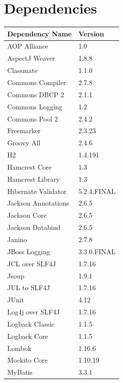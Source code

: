 \documentclass[12pt]{scrreprt}
\begin{document}
		\section{Dependencies}
			\label{sec:appendix_dependencies}

			\begin{longtable}{ l | l }
				\label{tab:appendix_dependencies}

				\textbf{Dependency Name} & \textbf{Version} \\
				\hline
				AOP Alliance						& 1.0				\\
				AspectJ Weaver						& 1.8.8				\\
				Classmate							& 1.1.0				\\
				Commons Compiler					& 2.7.8				\\
				Commons DBCP 2						& 2.1.1				\\
				Commons Logging						& 1.2				\\
				Commons Pool 2						& 2.4.2				\\
				Freemarker							& 2.3.23			\\
				Groovy All							& 2.4.6				\\
				H2									& 1.4.191			\\
				Hamcrest Core						& 1.3				\\
				Hamcrest Library					& 1.3				\\
				Hibernate Validator					& 5.2.4.FINAL		\\
				Jackson Annotations					& 2.6.5				\\
				Jackson Core						& 2.6.5				\\
				Jackson Databind					& 2.6.5				\\
				Janino								& 2.7.8				\\
				JBoss Logging						& 3.3.0.FINAL		\\
				JCL over SLF4J						& 1.7.16			\\
				Jsoup								& 1.9.1				\\
				JUL to SLF4J						& 1.7.16			\\
				JUnit								& 4.12				\\
				Log4j over SLF4J					& 1.7.16			\\
				Logback Classic						& 1.1.5				\\
				Logback Core						& 1.1.5				\\
				Lombok								& 1.16.6			\\
				Mockito Core						& 1.10.19			\\
				MyBatis								& 3.3.1				\\

\end{longtable}
\end{document}
